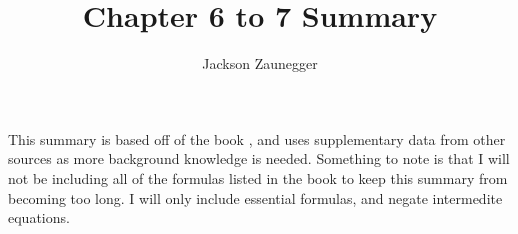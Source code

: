 \documentclass[12pt]{article}
\begin{document}
\title{Chapter 6 to 7 Summary}
\author{Jackson Zaunegger}
\date{}
\maketitle

\pagebreak
This summary is based off of the book \cite{BRA}, and uses supplementary data from other sources as more background knowledge is needed. Something to note is that I will not be including all of the formulas listed in the book to keep this summary from becoming too long. I will only include essential formulas, and negate intermedite equations. 
\tableofcontents

\pagebreak
\end{document}
